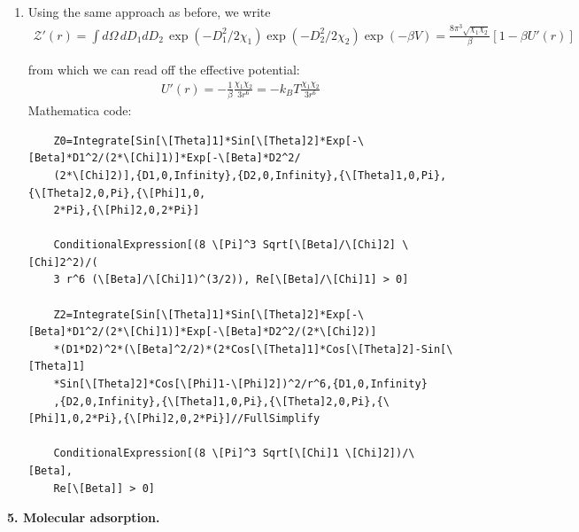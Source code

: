 \documentclass{article}
\theoremstyle{definition}
\newcommand{\be}{\beta}
\newcommand{\f}[2]{\frac{#1}{#2}}
\newcommand{\lb}{\left[}
\newcommand{\rb}{\right]}
\begin{document}
\begin{enumerate}[label=(\alph*)]
	
	
	\item Using the same approach as before, we write
	\begin{align*}
	\mathcal{Z}'(r) = \int d\Omega \,dD_1 dD_2\, \exp(-D_1^2/2\chi_1)\exp(-D_2^2/2\chi_2)\exp(-\be V) = \f{8\pi^3 \sqrt{\chi_1\chi_2}}{\be }\lb 1- \be U'(r) \rb
	\end{align*}
	
	from which we can read off the effective potential:
	\begin{align*}
	U'(r) = -\f{1}{\be} \f{\chi_1\chi_2}{3r^6} = \boxed{-k_BT \f{\chi_1\chi_2}{3r^6}}
	\end{align*}
	Mathematica code:
	\begin{lstlisting}
	Z0=Integrate[Sin[\[Theta]1]*Sin[\[Theta]2]*Exp[-\[Beta]*D1^2/(2*\[Chi]1)]*Exp[-\[Beta]*D2^2/
	(2*\[Chi]2)],{D1,0,Infinity},{D2,0,Infinity},{\[Theta]1,0,Pi},{\[Theta]2,0,Pi},{\[Phi]1,0,
	2*Pi},{\[Phi]2,0,2*Pi}]
	
	ConditionalExpression[(8 \[Pi]^3 Sqrt[\[Beta]/\[Chi]2] \[Chi]2^2)/(
	3 r^6 (\[Beta]/\[Chi]1)^(3/2)), Re[\[Beta]/\[Chi]1] > 0]
	
	Z2=Integrate[Sin[\[Theta]1]*Sin[\[Theta]2]*Exp[-\[Beta]*D1^2/(2*\[Chi]1)]*Exp[-\[Beta]*D2^2/(2*\[Chi]2)]
	*(D1*D2)^2*(\[Beta]^2/2)*(2*Cos[\[Theta]1]*Cos[\[Theta]2]-Sin[\[Theta]1]
	*Sin[\[Theta]2]*Cos[\[Phi]1-\[Phi]2])^2/r^6,{D1,0,Infinity}
	,{D2,0,Infinity},{\[Theta]1,0,Pi},{\[Theta]2,0,Pi},{\[Phi]1,0,2*Pi},{\[Phi]2,0,2*Pi}]//FullSimplify
	
	ConditionalExpression[(8 \[Pi]^3 Sqrt[\[Chi]1 \[Chi]2])/\[Beta], 
	Re[\[Beta]] > 0]
	\end{lstlisting}
\end{enumerate}



\noindent \textbf{5. Molecular adsorption.}
\end{document}
